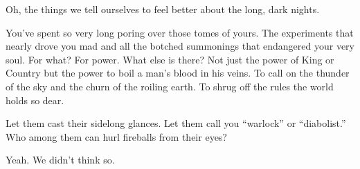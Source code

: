 

Oh, the things we tell ourselves to feel better about the long, dark nights.

 

You’ve spent so very long poring over those tomes of yours. The experiments that nearly drove you mad and all the botched summonings that endangered your very soul. For what? For power. What else is there? Not just the power of King or Country but the power to boil a man's blood in his veins. To call on the thunder of the sky and the churn of the roiling earth. To shrug off the rules the world holds so dear.

 

Let them cast their sidelong glances. Let them call you “warlock” or “diabolist.” Who among them can hurl fireballs from their eyes?

 

Yeah. We didn’t think so.



 
